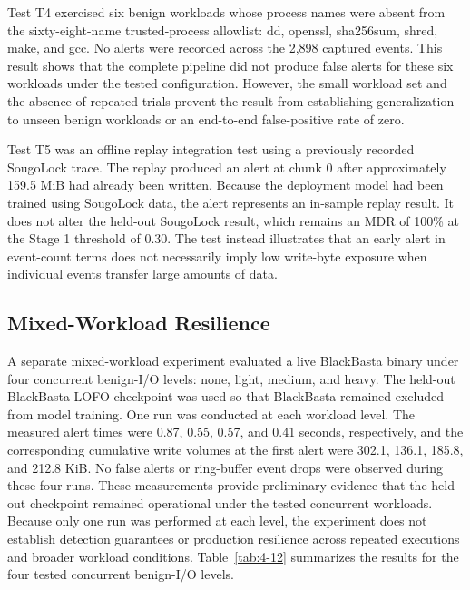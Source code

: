 Test T4 exercised six benign workloads whose process names were absent from the sixty-eight-name trusted-process allowlist: dd, openssl, sha256sum, shred, make, and gcc. No alerts were recorded across the 2,898 captured events. This result shows that the complete pipeline did not produce false alerts for these six workloads under the tested configuration. However, the small workload set and the absence of repeated trials prevent the result from establishing generalization to unseen benign workloads or an end-to-end false-positive rate of zero.

Test T5 was an offline replay integration test using a previously recorded SougoLock trace. The replay produced an alert at chunk 0 after approximately 159.5 MiB had already been written. Because the deployment model had been trained using SougoLock data, the alert represents an in-sample replay result. It does not alter the held-out SougoLock result, which remains an MDR of 100\% at the Stage 1 threshold of 0.30. The test instead illustrates that an early alert in event-count terms does not necessarily imply low write-byte exposure when individual events transfer large amounts of data.

\subsection{Mixed-Workload Resilience}\label{sec:4.8.3}

A separate mixed-workload experiment evaluated a live BlackBasta binary under four concurrent benign-I/\allowbreak{}O levels: none, light, medium, and heavy. The held-out BlackBasta LOFO checkpoint was used so that BlackBasta remained excluded from model training. One run was conducted at each workload level. The measured alert times were 0.87, 0.55, 0.57, and 0.41 seconds, respectively, and the corresponding cumulative write volumes at the first alert were 302.1, 136.1, 185.8, and 212.8 KiB. No false alerts or ring-buffer event drops were observed during these four runs. These measurements provide preliminary evidence that the held-out checkpoint remained operational under the tested concurrent workloads. Because only one run was performed at each level, the experiment does not establish detection guarantees or production resilience across repeated executions and broader workload conditions. Table~\ref{tab:4-12} summarizes the results for the four tested concurrent benign-I/\allowbreak{}O levels.


